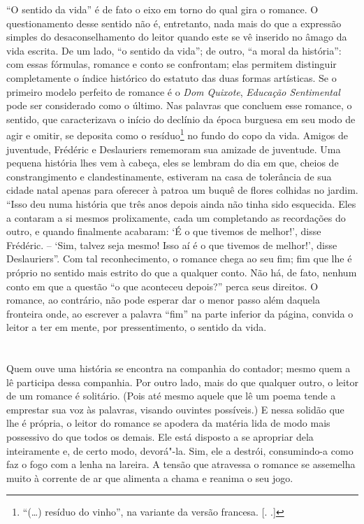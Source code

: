 ``O sentido da vida'' é de fato o eixo em torno do qual gira o romance.
O questionamento desse sentido não é, entretanto, nada mais do que a
expressão simples do desaconselhamento do leitor quando este se vê
inserido no âmago da vida escrita. De um lado, ``o sentido da vida'';
de outro, ``a moral da história'': com essas fórmulas, romance e conto
se confrontam; elas permitem distinguir completamente o índice histórico
do estatuto das duas formas artísticas. Se o primeiro modelo perfeito de
romance é o \emph{Dom Quixote}, \emph{Educação Sentimental} pode ser
considerado como o último. Nas palavras que concluem esse romance, o
sentido, que caracterizava o início do declínio da época burguesa em seu
modo de agir e omitir, se deposita como o resíduo\footnote{``(\ldots{}) resíduo do
  vinho'', na variante da versão francesa. [. .]} no fundo do
copo da vida. Amigos de juventude, Frédéric e Deslauriers rememoram sua
amizade de juventude. Uma pequena história lhes vem à cabeça, eles se
lembram do dia em que, cheios de constrangimento e clandestinamente,
estiveram na casa de tolerância de sua cidade natal apenas para oferecer
à patroa um buquê de flores colhidas no jardim. ``Isso deu numa história
que três anos depois ainda não tinha sido esquecida. Eles a contaram a
si mesmos prolixamente, cada um completando as recordações do outro, e
quando finalmente acabaram: `É o que tivemos de melhor!', disse
Frédéric. -- `Sim, talvez seja mesmo! Isso aí é o que tivemos de
melhor!', disse Deslauriers''. Com tal reconhecimento, o romance chega
ao seu fim; fim que lhe é próprio no sentido mais estrito do que a
qualquer conto. Não há, de fato, nenhum conto em que a questão ``o que
aconteceu depois?'' perca seus direitos. O romance, ao contrário, não
pode esperar dar o menor passo além daquela fronteira onde, ao escrever
a palavra ``fim'' na parte inferior da página, convida o leitor a ter em
mente, por pressentimento, o sentido da vida.

\section{}

Quem ouve uma história se encontra na companhia do contador; mesmo quem
a lê participa dessa companhia. Por outro lado, mais do que qualquer
outro, o leitor de um romance é solitário. (Pois até mesmo aquele que lê
um poema tende a emprestar sua voz às palavras, visando ouvintes
possíveis.) E nessa solidão que lhe é própria, o leitor do romance se
apodera da matéria lida de modo mais possessivo do que todos os demais.
Ele está disposto a se apropriar dela inteiramente e, de certo modo,
devorá"-la. Sim, ele a destrói, consumindo-a como faz o fogo com a lenha
na lareira. A tensão que atravessa o romance se assemelha muito à
corrente de ar que alimenta a chama e reanima o seu jogo.

